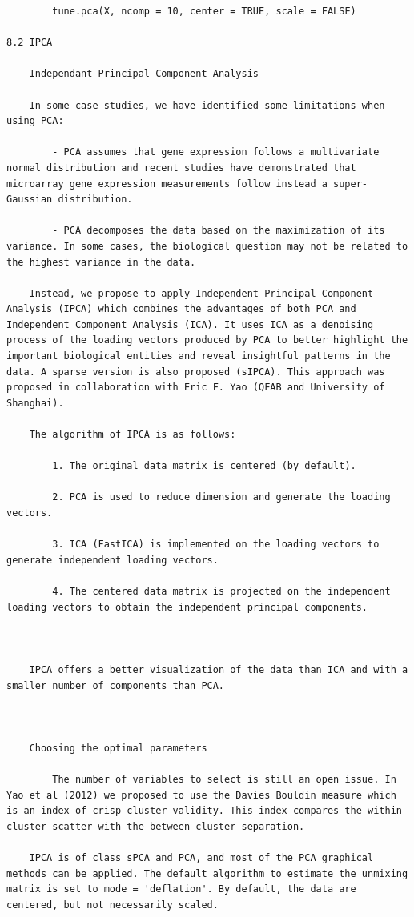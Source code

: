 \documentclass[
]{book}
\begin{document}
\begin{verbatim}
        tune.pca(X, ncomp = 10, center = TRUE, scale = FALSE)

8.2 IPCA

    Independant Principal Component Analysis

    In some case studies, we have identified some limitations when using PCA:

        - PCA assumes that gene expression follows a multivariate normal distribution and recent studies have demonstrated that microarray gene expression measurements follow instead a super-Gaussian distribution.

        - PCA decomposes the data based on the maximization of its variance. In some cases, the biological question may not be related to the highest variance in the data.

    Instead, we propose to apply Independent Principal Component Analysis (IPCA) which combines the advantages of both PCA and Independent Component Analysis (ICA). It uses ICA as a denoising process of the loading vectors produced by PCA to better highlight the important biological entities and reveal insightful patterns in the data. A sparse version is also proposed (sIPCA). This approach was proposed in collaboration with Eric F. Yao (QFAB and University of Shanghai).

    The algorithm of IPCA is as follows:

        1. The original data matrix is centered (by default).

        2. PCA is used to reduce dimension and generate the loading vectors.

        3. ICA (FastICA) is implemented on the loading vectors to generate independent loading vectors.

        4. The centered data matrix is projected on the independent loading vectors to obtain the independent principal components.



    IPCA offers a better visualization of the data than ICA and with a smaller number of components than PCA.



    Choosing the optimal parameters

        The number of variables to select is still an open issue. In Yao et al (2012) we proposed to use the Davies Bouldin measure which is an index of crisp cluster validity. This index compares the within-cluster scatter with the between-cluster separation.

    IPCA is of class sPCA and PCA, and most of the PCA graphical methods can be applied. The default algorithm to estimate the unmixing matrix is set to mode = 'deflation'. By default, the data are centered, but not necessarily scaled.


\end{verbatim}
\end{document}
